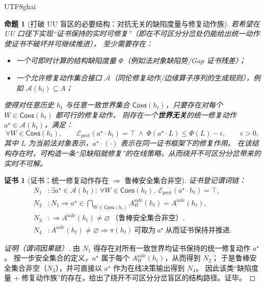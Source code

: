 \documentclass[12pt]{article}
\newtheorem{proposition}{命题}[section]
\newtheorem{Certificate}{证书}[section]
\begin{document}
\begin{CJK*}{UTF8}{gkai}
\begin{proposition}[打破 UU 盲区的必要结构：对抗无关的缺陷度量与修复动作族]
\label{prop:rt-open-adversarial-need-defect-repair}
若希望在 UU 口径下实现“证书保持的实时可修复”（即在不可区分分岔处仍能给出统一动作使证书不破坏并可继续推进），
至少需要存在：
\begin{itemize}
  \item 一个可即时计算的结构缺陷度量 $\Phi$（例如法对象缺陷势/Gap 证书残差）；
  \item 一个允许修复动作集合接口 $\mathcal{A}$（同伦修复动作/边缘算子序列的生成规则），例如 $\mathcal{A}(h_t)\subseteq A$；
\end{itemize}
使得对任意历史 $h_t$ 与任意一致世界集合 $\mathsf{Cons}(h_t)$，只要存在对每个 $W\in\mathsf{Cons}(h_t)$ 都可行的修复动作，
则存在一个\textbf{世界无关}的统一修复动作 $a^\star\in\mathcal{A}(h_t)$，满足：
\[
  \forall W\in\mathsf{Cons}(h_t),\qquad
  \mathcal{E}_{\mathrm{prot}}(a^\star\cdot h_t)=\top
  \ \wedge\
  \Phi(a^\star\cdot L)\le \Phi(L)-\epsilon,
  \qquad \epsilon>0,
\]
其中 $L$ 为当前法对象表示，$a^\star\cdot(\cdot)$ 表示在同一证书框架下的修复作用。
在该结构存在时，可构造一条“见缺陷就修复”的在线策略，从而绕开不可区分分岔带来的实时不可解。
\end{proposition}

\begin{Certificate}[证书：统一修复动作存在 $\Rightarrow$ 鲁棒安全集合非空]
\label{cert:rt-open-adversarial-need-defect-repair}
证书登记谓词链：
\[
\begin{aligned}
  N_1 &: \exists a^\star\in\mathcal{A}(h_t):\ \forall W\in\mathsf{Cons}(h_t),\ \mathcal{E}_{\mathrm{prot}}(a^\star\cdot
    h_t)=\top,\\
  N_2 &: N_1\Rightarrow a^\star\in \bigcap_{W\in\mathsf{Cons}(h_t)}A^{\mathrm{safe}}_{W}(h_t)=A^{\mathrm{safe}}(h_t),\\
  N_3 &: \Rightarrow A^{\mathrm{safe}}(h_t)\neq\varnothing\ \text{（鲁棒安全集合非空）},\\
  N_4 &: A^{\mathrm{safe}}(h_t)\neq\varnothing\Rightarrow \pi(h_t)\ \text{可取为}\ a^\star\ \text{从而证书保持并推进}.
\end{aligned}
\]
\end{Certificate}

\begin{proof}[证明（谓词因果链）]
由 $N_1$ 得存在对所有一致世界均证书保持的统一修复动作 $a^\star$。
按一步安全集合的定义，$a^\star$ 属于每个 $A^{\mathrm{safe}}_{W}(h_t)$，从而得到 $N_2$；
于是鲁棒安全集合非空（$N_3$），并可直接以 $a^\star$ 作为在线决策输出得到 $N_4$。
因此该类“缺陷度量 + 修复动作族”的存在，给出了绕开不可区分分岔盲区的结构路径。证毕。
\end{proof}


\end{CJK*}
\end{document}
